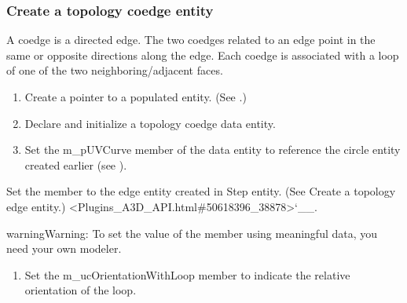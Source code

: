 \documentclass[letterpaper,12pt,english,openany,oneside]{sphinxmanual}
\begin{document}
\subsubsection{Create a topology co\sphinxhyphen{}edge entity}
\label{\detokenize{Plugins_A3D_API:create-a-topology-co-edge-entity}}
A coedge is a directed edge. The two co\sphinxhyphen{}edges related to an edge point in the same or opposite directions along the edge. Each co\sphinxhyphen{}edge is associated with a loop of one of the two neighboring/adjacent faces.
\begin{enumerate}
%
\item {} 
Create a pointer to a populated  entity. (See .)

\item {} 
Declare and initialize a topology co\sphinxhyphen{}edge data entity.

\item {} 
Set the m\_pUVCurve member of the data entity to reference the circle entity created earlier (see ).

\end{enumerate}

Set the  member to the edge entity created in Step  entity. (See Create a topology edge entity.) <Plugins\_A3D\_API.html\#50618396\_38878>`\_\_.

\begin{sphinxadmonition}{warning}{Warning:}
To set the value of the  member using meaningful data, you need your own modeler.
\end{sphinxadmonition}

\begin{sphinxVerbatim}[commandchars=\\\{\}]
 
  
  
\end{sphinxVerbatim}
\begin{enumerate}
%
\setcounter{enumi}{3}
\item {} 
Set the m\_ucOrientationWithLoop member to indicate the relative orientation of the loop.

\end{enumerate}
\end{document}
